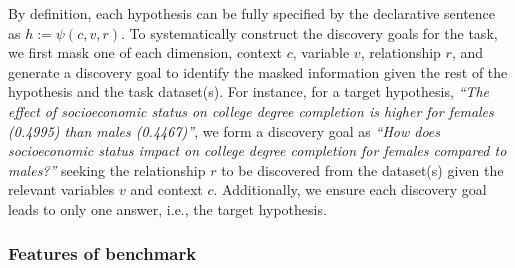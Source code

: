 By definition, each hypothesis can be fully specified by the declarative sentence as $h:= \psi(c, v, r)$. To systematically construct the discovery goals for the task, we first mask one of each dimension, context $c$, variable $v$, relationship $r$, and generate a discovery goal to identify the masked information given the rest of the hypothesis and the task dataset(s). For instance, for a target hypothesis, \emph{``The effect of socioeconomic status on college degree completion is higher for females (0.4995) than males (0.4467)''}, we form a discovery goal as \emph{``How does socioeconomic status impact on college degree completion for females compared to males?''} seeking the relationship $r$ to be discovered from the dataset(s) given the relevant variables $v$ and context $c$. Additionally, we ensure each discovery goal leads to only one answer, i.e., the target hypothesis. 





\subsubsection{Features of \real{} benchmark}

